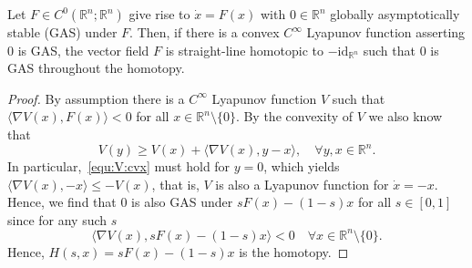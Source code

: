 \documentclass[10pt,a4paper]{amsart}
\begin{document}
\begin{theorem}
\label{thm:cvx:Lyap}
    Let $F\in C^{0}(\mathbb{R}^n;\mathbb{R}^n)$ give rise to $\dot{x}=F(x)$ with $0\in \mathbb{R}^n$ globally asymptotically stable (GAS) under $F$. Then, if there is a convex $C^{\infty}$ Lyapunov function asserting $0$ is GAS, the vector field $F$ is straight-line homotopic to $-\mathrm{id}_{\mathbb{R}^n}$ such that $0$ is GAS throughout the homotopy.
\end{theorem}

\begin{proof}
    {By assumption there is a $C^{\infty}$ Lyapunov function $V$ such that $\langle \nabla V(x),F(x) \rangle <0$ for all $x\in \mathbb{R}^n\setminus\{0\}$. By the convexity of $V$ we also know that
    \begin{equation}
        \label{equ:V:cvx}
        V(y)\geq V(x) + \langle \nabla V(x),y-x \rangle,\quad \forall y,x\in \mathbb{R}^n.
    \end{equation}
    In particular,~\eqref{equ:V:cvx} must hold for $y=0$, which yields $\langle \nabla V(x),-x\rangle \leq- V(x)$, that is, $V$ is also a Lyapunov function for $\dot{x}=-x$. 
    Hence, we find that $0$ is also GAS under $sF(x)-(1-s)x$ for all $s\in [0,1]$ since for any such $s$
    \begin{equation*}
        \langle \nabla V(x), sF(x)-(1-s)x\rangle <0 \quad \forall x\in \mathbb{R}^n\setminus \{0\}.
    \end{equation*}
Hence, $H(s,x)=sF(x)-(1-s)x$ is the homotopy.} 
\end{proof}
\end{document}
